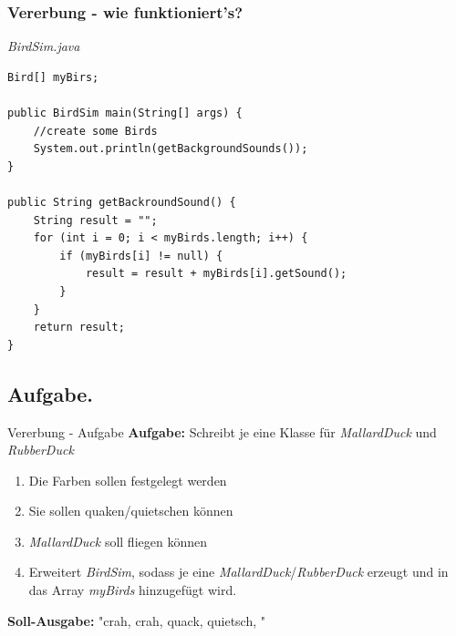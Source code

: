 \documentclass[18pt]{beamer}
\begin{document}

\begin{frame}[containsverbatim]
	\frametitle{Vererbung - wie funktioniert's?}
	\emph{BirdSim.java}
	\begin{lstlisting}
Bird[] myBirs;	
	
public BirdSim main(String[] args) {
	//create some Birds
	System.out.println(getBackgroundSounds());
}

public String getBackroundSound() {
	String result = "";
	for (int i = 0; i < myBirds.length; i++) {
		if (myBirds[i] != null) {
			result = result + myBirds[i].getSound();
		}
	}
	return result;
}
	\end{lstlisting}
\end{frame}

\subsection{Aufgabe.}
\begin{frame}{Vererbung - Aufgabe}
	\textbf{Aufgabe:} Schreibt je eine Klasse für \emph{MallardDuck} und \emph{RubberDuck} \pause
	
	\begin{enumerate}		
		\item Die Farben sollen festgelegt werden
		\item Sie sollen quaken/quietschen können
		\item \emph{MallardDuck} soll fliegen können
		\item Erweitert \emph{BirdSim}, sodass je eine \emph{MallardDuck}/\emph{RubberDuck} erzeugt und in das Array \emph{myBirds} hinzugefügt wird.
	\end{enumerate}
	
	\textbf{Soll-Ausgabe:} "crah, crah, quack, quietsch, "
\end{frame}


\end{document}
